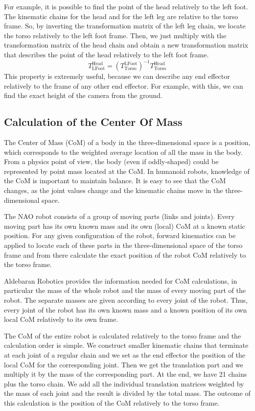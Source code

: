 For example, it is possible to find the point of the head relatively to the left foot. The kinematic chains for the head and for the left leg are relative to the torso frame. So, by inverting the transformation matrix of the left leg chain, we locate the torso relatively to the left foot frame. Then, we just multiply with the transformation matrix of the head chain and obtain a new transformation matrix that describes the point of the head relatively to the left foot frame.
\[
T^\text{Head}_\text{LFoot} = {\left(T^\text{LFoot}_\text{Torso}\right)}^{-1}T^\text{Head}_\text{Torso}
\]
This property is extremely useful, because we can describe any end effector relatively to the frame of any other end effector. For example, with this, we can find the exact height of the camera from the ground.

\subsection{Calculation of the Center Of Mass}
The Center of Mass (CoM) of a body in the three-dimensional space is a position, which corresponds to the weighted average location of all the mass in the body. From a physics point of view, the body (even if oddly-shaped) could be represented by point mass located at the CoM. In humanoid robots, knowledge of the CoM is important to maintain balance. It is easy to see that the CoM changes, as the joint values change and the kinematic chains move in the three-dimensional space. 

The NAO robot consists of a group of moving parts (links and joints). Every moving part has its own known mass and its own (local) CoM at a known static position. For any given configuration of the robot, forward kinematics can be applied to locate each of these parts in the three-dimensional space of the torso frame and from there calculate the exact position of the robot CoM relatively to the torso frame. 

Aldebaran Robotics provides the information needed for CoM calculations, in particular the mass of the whole robot and the mass of every moving part of the robot. The separate masses are given according to every joint of the robot. Thus, every joint of the robot has its own known mass and a known position of its own local CoM relatively to its own frame.

The CoM of the entire robot is calculated relatively to the torso frame and the calculation order is simple. We construct smaller kinematic chains that terminate at each joint of a regular chain and we set as the end effector the position of the local CoM for the corresponding joint. Then we get the translation part and we multiply it by the mass of the corresponding part. At the end, we have 21 chains plus the torso chain. We add all the individual translation matrices weighted by the mass of each joint and the result is divided by the total mass. The outcome of this calculation is the position of the CoM relatively to the torso frame.











